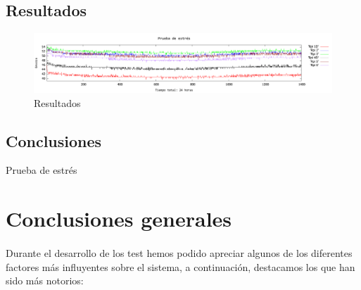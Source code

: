 \subsection{Resultados}

\begin{figure}[H]
	\centering
  	\includegraphics[width=175mm]{Test/pr4_estres.pdf}
   	\caption[Prueba 4, Prueba de estrés]{Resultados}
   \label{figure5.13}
\end{figure}

\subsection{Conclusiones}

Prueba de estrés

\section{Conclusiones generales}
\label{makereference5.7}
\paragraph{}

Durante el desarrollo de los test hemos podido apreciar algunos de los diferentes factores más influyentes sobre el sistema, a continuación, destacamos los que han sido más notorios:

